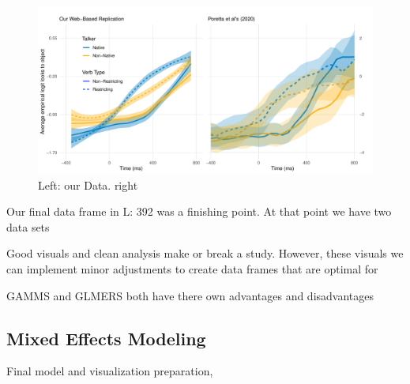 \begin{figure}[h]
    \centering
    \includegraphics[width=\textwidth]{figures/smooth_comparison_plot.pdf}
    \caption{Left: our Data. right \parencite{Porretta_et_al_2020}}
    \label{fig:smooth}
\end{figure}

Our final data frame in L: 392 was a finishing point. At that point we have two data sets

Good visuals and clean analysis make or break a study. However, these visuals we can implement minor adjustments to create data frames that are optimal for







GAMMS and GLMERS both have there own advantages and disadvantages \parencite{Ito_Knoeferle_2022}

\subsection{Mixed Effects Modeling}
Final model and visualization preparation, 







